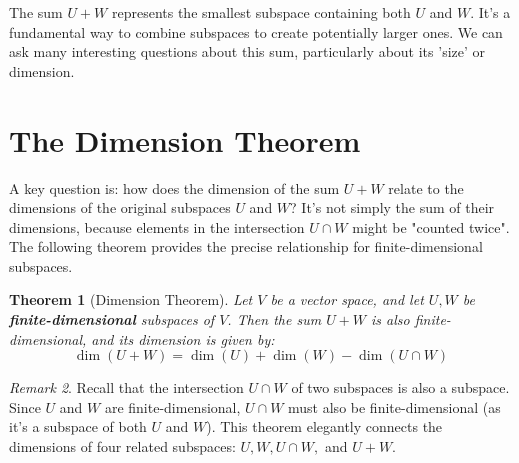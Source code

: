 \documentclass[11pt]{article}
\newtheorem{theorem}{Theorem}[section]
\theoremstyle{definition}
\theoremstyle{remark}
\newtheorem{remark}[theorem]{Remark}
\newcommand{\dimn}{\operatorname{dim}}
\newcommand{\intersect}{\cap}
\begin{document}
The sum $U+W$ represents the smallest subspace containing both $U$ and $W$. It's a fundamental way to combine subspaces to create potentially larger ones. We can ask many interesting questions about this sum, particularly about its 'size' or dimension.

\section{The Dimension Theorem}

A key question is: how does the dimension of the sum $U+W$ relate to the dimensions of the original subspaces $U$ and $W$? It's not simply the sum of their dimensions, because elements in the intersection $U \intersect W$ might be "counted twice". The following theorem provides the precise relationship for finite-dimensional subspaces.

\begin{theorem}[Dimension Theorem]
Let $V$ be a vector space, and let $U, W$ be \textbf{finite-dimensional} subspaces of $V$. Then the sum $U+W$ is also finite-dimensional, and its dimension is given by:
\[
\dimn(U+W) = \dimn(U) + \dimn(W) - \dimn(U \intersect W)
\]
\end{theorem}

\begin{remark}
Recall that the intersection $U \intersect W$ of two subspaces is also a subspace. Since $U$ and $W$ are finite-dimensional, $U \intersect W$ must also be finite-dimensional (as it's a subspace of both $U$ and $W$). This theorem elegantly connects the dimensions of four related subspaces: $U, W, U \intersect W,$ and $U+W$.
\end{remark}
\end{document}

